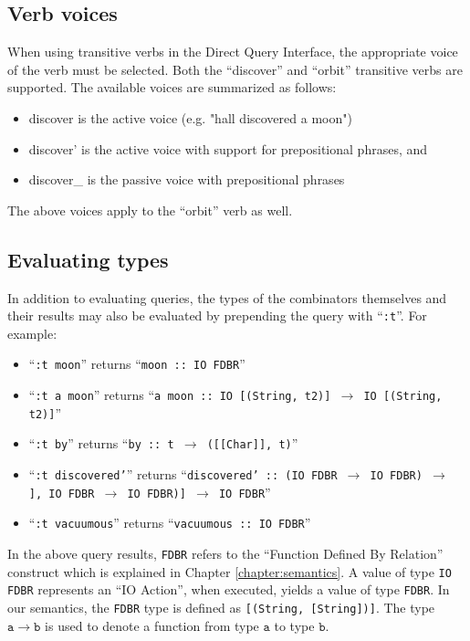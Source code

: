\documentclass[../main.tex]{subfiles}
\begin{document}
\subsection{Verb voices}

When using transitive verbs in the Direct Query Interface, the appropriate voice of the verb must be selected.  Both the ``discover'' and ``orbit''
transitive verbs are supported.  The available voices are summarized as follows:

\begin{itemize}
	\item discover is the active voice (e.g. "hall discovered a moon")
	\item discover' is the active voice with support for prepositional phrases, and
	\item discover\_ is the passive voice with prepositional phrases
\end{itemize}

The above voices apply to the ``orbit'' verb as well.

\subsection{Evaluating types}

In addition to evaluating queries, the types of the combinators themselves and their results may also be evaluated by prepending the query with
``\texttt{:t}''.  For example:

\begin{itemize}
	\item ``\texttt{:t moon}'' returns ``\texttt{moon :: IO FDBR}''
	\item ``\texttt{:t a moon}'' \subitem returns ``\texttt{a moon :: IO [(String,  t2)] $\rightarrow$ IO [(String,  t2)]}''
	\item ``\texttt{:t by}'' returns ``\texttt{by :: t $\rightarrow$ ([[Char]],  t)}''
	\item ``\texttt{:t discovered'}'' \subitem returns ``\texttt{discovered' :: (IO FDBR $\rightarrow$ IO FDBR) $\rightarrow$ \subsubitem [([[Char]],  IO FDBR $\rightarrow$ IO FDBR)] $\rightarrow$ IO FDBR}''
	\item ``\texttt{:t vacuumous}'' returns ``\texttt{vacuumous :: IO FDBR}''
\end{itemize}

In the above query results, \texttt{FDBR} refers to the ``Function Defined By Relation'' construct which is explained in Chapter \ref{chapter:semantics}.  A value of type
\texttt{IO FDBR} represents an ``IO Action'', when executed, yields a value of type \texttt{FDBR}.  In our semantics, the \texttt{FDBR} type is defined as \texttt{[(String, [String])]}.
The type $\mathtt{a \rightarrow b}$ is used to denote a function from type $\mathtt{a}$ to type $\mathtt{b}$.
\end{document}
